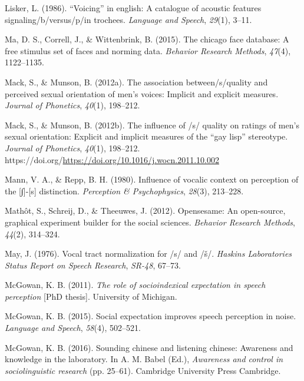 \documentclass[
  letterpaper,
  DIV=11,
  numbers=noendperiod]{scrartcl}
\newlength{\cslhangindent}
\newenvironment{CSLReferences}[2] %
 {\begin{list}{}{%
  \setlength{\itemindent}{0pt}
  \setlength{\leftmargin}{0pt}
  \setlength{\parsep}{0pt}
  \ifodd #1
   \setlength{\leftmargin}{\cslhangindent}
   \setlength{\itemindent}{-1\cslhangindent}
  \fi
  \setlength{\itemsep}{#2\baselineskip}}}
 {\end{list}}
\begin{document}
\begin{CSLReferences}{1}{0}
Lisker, L. (1986). {``Voicing''} in english: A catalogue of acoustic
features signaling/b/versus/p/in trochees. \emph{Language and Speech},
\emph{29}(1), 3--11.

Ma, D. S., Correll, J., \& Wittenbrink, B. (2015). The chicago face
database: A free stimulus set of faces and norming data. \emph{Behavior
Research Methods}, \emph{47}(4), 1122--1135.

Mack, S., \& Munson, B. (2012a). The association between/s/quality and
perceived sexual orientation of men's voices: Implicit and explicit
measures. \emph{Journal of Phonetics}, \emph{40}(1), 198--212.

Mack, S., \& Munson, B. (2012b). The influence of /s/ quality on ratings
of men's sexual orientation: Explicit and implicit measures of the
{``gay lisp''} stereotype. \emph{Journal of Phonetics}, \emph{40}(1),
198--212.
https://doi.org/\url{https://doi.org/10.1016/j.wocn.2011.10.002}

Mann, V. A., \& Repp, B. H. (1980). Influence of vocalic context on
perception of the {[}∫{]}-{[}s{]} distinction. \emph{Perception \&
Psychophysics}, \emph{28}(3), 213--228.

Mathôt, S., Schreij, D., \& Theeuwes, J. (2012). Opensesame: An
open-source, graphical experiment builder for the social sciences.
\emph{Behavior Research Methods}, \emph{44}(2), 314--324.

May, J. (1976). Vocal tract normalization for /s/ and /š/. \emph{Haskins
Laboratories Status Report on Speech Research}, \emph{SR-48}, 67--73.

McGowan, K. B. (2011). \emph{The role of socioindexical expectation in
speech perception} {[}PhD thesis{]}. University of Michigan.

McGowan, K. B. (2015). Social expectation improves speech perception in
noise. \emph{Language and Speech}, \emph{58}(4), 502--521.

McGowan, K. B. (2016). Sounding chinese and listening chinese: Awareness
and knowledge in the laboratory. In A. M. Babel (Ed.), \emph{Awareness
and control in sociolinguistic research} (pp. 25--61). Cambridge
University Press Cambridge.


\end{CSLReferences}
\end{document}
